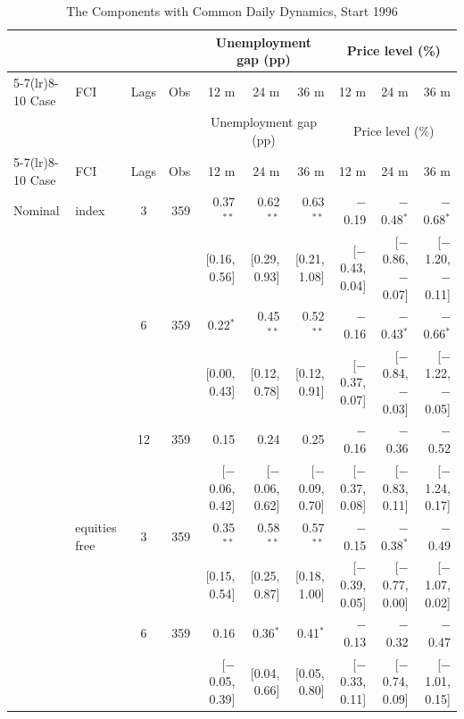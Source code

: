 \begingroup\scriptsize\setlength{\tabcolsep}{0.9pt}
\begin{longtable}{llcrrrrrrr}
\caption{The Components with Common Daily Dynamics, Start 1996}\label{tab:appR4c}\\
\toprule
 & & & & \multicolumn{3}{c}{Unemployment gap (pp)} & \multicolumn{3}{c}{Price level (\%)}\\ \cmidrule(lr){5-7}\cmidrule(lr){8-10}
Case & FCI & Lags & Obs & 12 m & 24 m & 36 m & 12 m & 24 m & 36 m\\
\midrule\endfirsthead
\toprule
 & & & & \multicolumn{3}{c}{Unemployment gap (pp)} & \multicolumn{3}{c}{Price level (\%)}\\ \cmidrule(lr){5-7}\cmidrule(lr){8-10}
Case & FCI & Lags & Obs & 12 m & 24 m & 36 m & 12 m & 24 m & 36 m\\
\midrule\endhead
\bottomrule\endfoot
Nominal & index & 3 & 359 & 0.37$^{**}$ & 0.62$^{**}$ & 0.63$^{**}$ & $-$0.19 & $-$0.48$^{*}$ & $-$0.68$^{*}$\\
 & & & & {\scriptsize [0.16, 0.56]} & {\scriptsize [0.29, 0.93]} & {\scriptsize [0.21, 1.08]} & {\scriptsize [$-$0.43, 0.04]} & {\scriptsize [$-$0.86, $-$0.07]} & {\scriptsize [$-$1.20, $-$0.11]}\\
 &  & 6 & 359 & 0.22$^{*}$ & 0.45$^{**}$ & 0.52$^{**}$ & $-$0.16 & $-$0.43$^{*}$ & $-$0.66$^{*}$\\
 & & & & {\scriptsize [0.00, 0.43]} & {\scriptsize [0.12, 0.78]} & {\scriptsize [0.12, 0.91]} & {\scriptsize [$-$0.37, 0.07]} & {\scriptsize [$-$0.84, $-$0.03]} & {\scriptsize [$-$1.22, $-$0.05]}\\
 &  & 12 & 359 & 0.15 & 0.24 & 0.25 & $-$0.16 & $-$0.36 & $-$0.52\\
 & & & & {\scriptsize [$-$0.06, 0.42]} & {\scriptsize [$-$0.06, 0.62]} & {\scriptsize [$-$0.09, 0.70]} & {\scriptsize [$-$0.37, 0.08]} & {\scriptsize [$-$0.83, 0.11]} & {\scriptsize [$-$1.24, 0.17]}\\
 & equities free & 3 & 359 & 0.35$^{**}$ & 0.58$^{**}$ & 0.57$^{**}$ & $-$0.15 & $-$0.38$^{*}$ & $-$0.49\\
 & & & & {\scriptsize [0.15, 0.54]} & {\scriptsize [0.25, 0.87]} & {\scriptsize [0.18, 1.00]} & {\scriptsize [$-$0.39, 0.05]} & {\scriptsize [$-$0.77, 0.00]} & {\scriptsize [$-$1.07, 0.02]}\\
 &  & 6 & 359 & 0.16 & 0.36$^{*}$ & 0.41$^{*}$ & $-$0.13 & $-$0.32 & $-$0.47\\
 & & & & {\scriptsize [$-$0.05, 0.39]} & {\scriptsize [0.04, 0.66]} & {\scriptsize [0.05, 0.80]} & {\scriptsize [$-$0.33, 0.11]} & {\scriptsize [$-$0.74, 0.09]} & {\scriptsize [$-$1.01, 0.15]}\\

\end{longtable}
